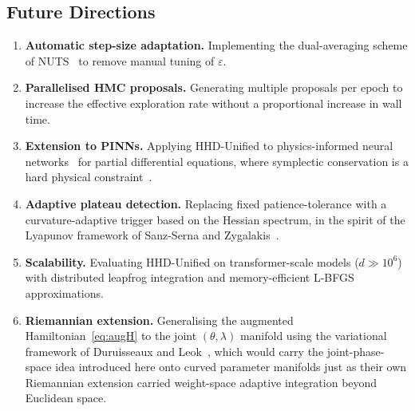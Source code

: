 \documentclass[11pt]{article}
\theoremstyle{definition}
\begin{document}
\subsection*{Future Directions}

\begin{enumerate}[leftmargin=*,label=\arabic*.]

  \item \textbf{Automatic step-size adaptation.} Implementing the
        dual-averaging scheme of NUTS~\cite{hoffman2014nuts} to
        remove manual tuning of $\varepsilon$.

  \item \textbf{Parallelised HMC proposals.} Generating multiple
        proposals per epoch to increase the effective exploration
        rate without a proportional increase in wall time.

  \item \textbf{Extension to PINNs.} Applying HHD-Unified to
        physics-informed neural
        networks~\cite{raissi2019pinns,krishnapriyan2021,wang2023}
        for partial differential equations, where symplectic
        conservation is a hard physical constraint~\cite{kiyani2025}.

  \item \textbf{Adaptive plateau detection.} Replacing fixed
        patience-tolerance with a curvature-adaptive trigger based
        on the Hessian spectrum, in the spirit of the Lyapunov
        framework of Sanz-Serna and
        Zygalakis~\cite{sanzserna2021lyapunov,dobson2025connections}.

  \item \textbf{Scalability.} Evaluating HHD-Unified on transformer-scale
        models ($d\gg10^6$) with distributed leapfrog integration and
        memory-efficient L-BFGS approximations.

  \item \textbf{Riemannian extension.} Generalising the augmented
        Hamiltonian~\eqref{eq:augH} to the joint $(\theta,\lambda)$
        manifold using the variational framework of Duruisseaux and
        Leok~\cite{duruisseaux2022variational}, which would carry
        the joint-phase-space idea introduced here onto curved
        parameter manifolds just as their own Riemannian extension
        carried weight-space adaptive integration beyond Euclidean
        space.

\end{enumerate}

\end{document}
